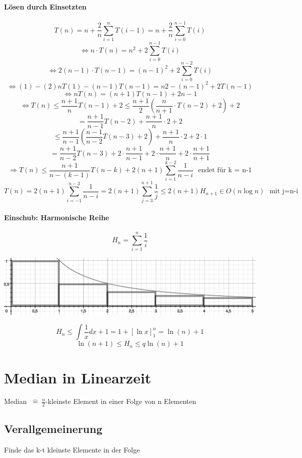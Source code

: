\paragraph{Lösen durch Einsetzten}
\[T(n) = n + \frac{2}{n} \sum_{i=1}^n T(i-1) = n + \frac{2}{n} \sum_{i=0}^{n-1} T(i)\]
\[ \Leftrightarrow n \cdot T(n) = n^2 + 2 \sum_{i=0}^{n-1} T(i) \]
\[ \Leftrightarrow 2(n-1) \cdot T(n-1) = (n-1)^2 + 2 \sum_{i=0}^{n-2} T(i) \]
\[ \Leftrightarrow (1)-(2) n T(1)-(n-1) T(n-1) = n2 -(n-1)^2 + 2 T(n-1) \]
\[ \Leftrightarrow n T(n) = (n+1) T(n-1) + 2n-1 \]
\[ \Leftrightarrow T(n) \leq \frac{n+1}{n} T(n-1) + 2 \leq \frac{n+1}{2} \left(\frac{n}{n+1} \cdot T(n-2) + 2 \right) + 2 \]
\[ = \frac{n+1}{n-1} T(n-2) + \frac{n+1}{n} \cdot 2 + 2\]
\[ \leq \frac{n+1}{n-1} \left(\frac{n-1}{n-2} T(n-3) +2 \right) + \frac{n+1}{n} \cdot 2 + 2 \cdot 1\]
\[= \frac{n+1}{n-2} T(n-3) + 2 \cdot \frac{n+1}{n-1} + 2 \cdot \frac{n+1}{n} + 2 \cdot \frac{n+1}{n+1} \]
\[ \Rightarrow T(n) \leq \frac{n+1}{n-(k-1)} T(n-k) + 2(n+1) \sum_{i=1}^{k-2} \frac{1}{n-i} ~~~\text{endet für k = n-1}\]
\[ T(n) = 2(n+1) \sum_{i=-1}^{n-3} \frac{1}{n-i} = 2(n+1) \sum_{j=3}^{n+1} \frac{1}{j} \leq 2 (n+1) H_{n+1} \in O(n \log n) ~~~\text{mit j=n-i} \] 

\begin{mdframed}
\paragraph{Einschub: Harmonische Reihe}
\[ H_n = \sum_{i=1}^{n} \frac{1}{i} \]

\includegraphics[width=\linewidth]{6/Grafik/img4.png}


\[H_n \leq \int \frac{1}{x} dx +1 = 1 + [\ln x]_1^n = \ln(n)+1 \]
\[\ln(n+1) \leq H_n \le	q \ln(n)+1 \]
\end{mdframed}

\pagebreak 

\section{Median in Linearzeit}
Median  $~\hat{=}~ \frac{n}{2} $-kleinste Element in einer Folge von n Elementen

\subsection*{Verallgemeinerung}
Finde das k-t kleinste Elemente in der Folge\\

